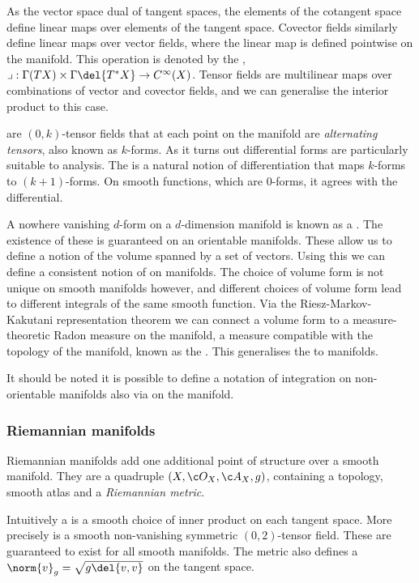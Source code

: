 As the vector space dual of tangent spaces, the elements of the cotangent space define linear maps over elements of the tangent space.
Covector fields similarly define linear maps over vector fields, where the linear map is defined pointwise on the manifold.
This operation is denoted by the , \(\iprod: \Gamma(TX) \x \Gamma \del{T^*X} \to C^\infty(X)\).
Tensor fields are multilinear maps over combinations of vector and covector fields, and we can generalise the interior product to this case.

 are \((0,k)\)-tensor fields that at each point on the manifold are \emph{alternating tensors}, also known as \(k\)-forms.
As it turns out differential forms are particularly suitable to analysis.
The  is a natural notion of differentiation that maps \(k\)-forms to \((k+1)\)-forms.
On smooth functions, which are \(0\)-forms, it agrees with the differential.

A nowhere vanishing \(d\)-form on a \(d\)-dimension manifold is known as a .
The existence of these is guaranteed on an orientable manifolds.
These allow us to define a notion of the volume spanned by a set of vectors.
Using this we can define a consistent notion of  on manifolds.
The choice of volume form is not unique on smooth manifolds however, and different choices of volume form lead to different integrals of the same smooth function.
Via the Riesz-Markov-Kakutani representation theorem we can connect a volume form to a measure-theoretic Radon measure on the manifold, a measure compatible with the topology of the manifold, known as the .
This generalises the  to manifolds.

It should be noted it is possible to define a notation of integration on non-orientable manifolds also via  on the manifold.

\subsubsection{Riemannian manifolds}
Riemannian manifolds add one additional point of structure over a smooth manifold.
They are a quadruple \((X, \topo{X}, \atlas{X}, g)\), containing a topology, smooth atlas and a \emph{Riemannian metric}.

Intuitively a  is a smooth choice of inner product on each tangent space.
More precisely is a smooth non-vanishing symmetric \((0,2)\)-tensor field.
These are guaranteed to exist for all smooth manifolds.
The metric also defines a  \(\norm{v}_g = \sqrt{g\del{v, v}}\) on the tangent space.

